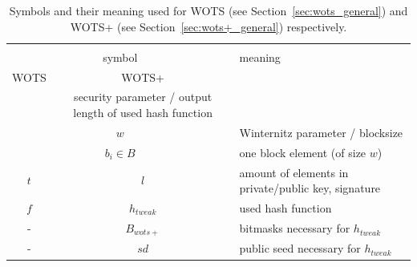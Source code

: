 \begin{table}
\centering
\begin{tabular}{c c l} 
 \hline\noalign{\smallskip}
 \multicolumn{3}{c}{\textbf{WOTS/WOTS+ Parameter}} \\
 \multicolumn{2}{c}{symbol} & meaning \\
 \noalign{\smallskip}
 WOTS & WOTS+ &  \\ 
 \hline\noalign{\smallskip}
 \multicolumn{2}{c}{$n$} & security parameter / output length of used hash function \\
 \multicolumn{2}{c}{$w$} & Winternitz parameter / blocksize  \\ 
 \multicolumn{2}{c}{$b_i \in B$} & one block element (of size $w$) \\ 
 $t$ & $l$ & amount of elements in private/public key, signature \\ 
 $f$ & $h_{tweak}$ & used hash function \\
 - & $B_{wots+}$ & bitmasks necessary for $h_{tweak}$ \\
 - & $sd$ & public seed necessary for $h_{tweak}$ \\ 
 \hline
\end{tabular}
\caption{Symbols and their meaning used for WOTS (see Section~\ref{sec:wots_general}) and WOTS+ (see Section~\ref{sec:wots+_general}) respectively.}
\label{table:wots_wots+_diff}
\end{table}

